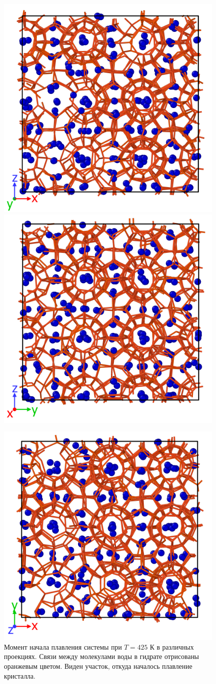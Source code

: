 \begin{figure}[H]
    \centering
    \begin{minipage}{\linewidth}
        \includegraphics[width=.45\linewidth]{figures/tip4p_melt1.png}
        \includegraphics[width=.45\linewidth]{figures/tip4p_melt2.png}
    \end{minipage}
    \begin{minipage}{\linewidth}
        \centering
        \includegraphics[width=.45\linewidth]{figures/tip4p_melt3.png}
    \end{minipage}
    \caption{Момент начала плавления системы при $T=425$ К в различных проекциях. Связи между молекулами воды в гидрате отрисованы оранжевым цветом. Виден участок, откуда началось плавление кристалла.}
    \label{fig3.10}
\end{figure}

